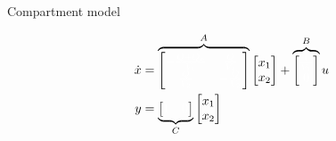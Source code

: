 \documentclass[presentation,aspectratio=169]{beamer}
\begin{document}
\begin{frame}[label={sec:org8b776f0}]{Compartment model}
\begin{center}
\Large
\begin{align*}
  \dot{x} &= \overbrace{\begin{bmatrix} \textcolor{white}{-\frac{Q+Q_o}{V_1}}  & \textcolor{white}{\frac{Q}{V_1}}\\
              \textcolor{white}{\frac{Q}{V_2}}  & \textcolor{white}{-\frac{Q}{V_2}}\end{bmatrix}}^A \begin{bmatrix} {x_1}\\ {x_2}\end{bmatrix}  + \overbrace{\begin{bmatrix} \textcolor{white}{\frac{1}{V_1}} \\ \textcolor{white}{0} \end{bmatrix}}^B  u \\
       y &=  \underbrace{\begin{bmatrix} \textcolor{white}{1} &  \textcolor{white}{0}\end{bmatrix}}_C \begin{bmatrix} x_1\\ x_2\end{bmatrix}
\end{align*}

\end{center}
\end{frame}
\end{document}
